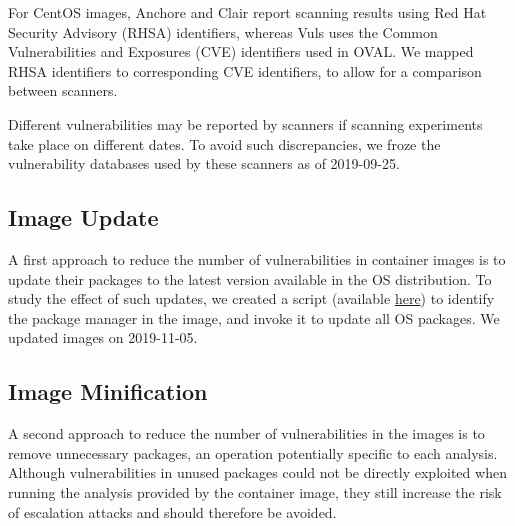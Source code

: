 \documentclass[a4paper,num-refs]{oup-contemporary}
\newcommand{\change}[2]{\color{cyan}Changes: #1\color{black}}
\newcommand{\tristan}[1]{\color{red}From Tristan: #1\color{black}}
\newcommand{\revision}[1]{\color{ao(english)}#1\color{black}\xspace}
\begin{document}
For CentOS images, Anchore and Clair \revision{report} scanning results using Red Hat
Security Advisory (RHSA) identifiers, whereas Vuls uses the Common
Vulnerabilities and Exposures (CVE) identifiers used in OVAL. We mapped
RHSA identifiers to corresponding CVE identifiers, to allow for a
comparison between scanners.

Different vulnerabilities may be reported by scanners if scanning
experiments take place on different dates. To avoid such discrepancies, we
froze the vulnerability databases used by these scanners as of 2019-09-25.

\subsection{Image Update}

A first approach to reduce the number of vulnerabilities in container
images is to update their packages to the latest version available in the OS
distribution. To study the effect of such updates, we \revision{created} a script
(available
\href{https://github.com/big-data-lab-team/container-vulnerabilities-paper/blob/master/Scripts/update}{here})
to identify the package manager in the image, and invoke it to update all
OS packages. We updated images on 2019-11-05.

\subsection{Image Minification}

A second approach to reduce the number of vulnerabilities in the images is
to remove unnecessary packages, an operation potentially specific to each
analysis. \revision{Although vulnerabilities in unused packages could not
be directly exploited when running the analysis provided by the container
image, they still increase the risk of escalation attacks and should
therefore be avoided.}
\end{document}
